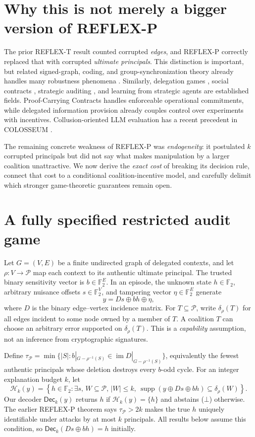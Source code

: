 \documentclass[10pt,a4paper]{article}
\newcommand{\F}{\mathbb F_2}
\newcommand{\Pc}{\mathcal P}
\newcommand{\supp}{\operatorname{supp}}
\newcommand{\Dec}{\mathsf{Dec}}
\newcommand{\deltaP}{\delta_\rho}
\begin{document}
\section{Why this is not merely a bigger version of REFLEX-P}
The prior REFLEX-T result counted corrupted \emph{edges}, and REFLEX-P correctly replaced that with corrupted \emph{ultimate principals}. This distinction is important, but related signed-graph, coding, and group-synchronization theory already handles many robustness phenomena \cite{lerman2021,group2026}. Similarly, delegation games \cite{sourbut2024}, social contracts \cite{davoust2020}, strategic auditing \cite{das2026}, and learning from strategic agents \cite{cacciamani2024} are established fields. Proof-Carrying Contracts \cite{ciliberto2026} handles enforceable operational commitments, while delegated information provision \cite{bilotta2026} already couples control over experiments with incentives. Collusion-oriented LLM evaluation has a recent precedent in COLOSSEUM \cite{colosseum2026}.\par
The remaining concrete weakness of REFLEX-P was \emph{endogeneity}: it postulated $k$ corrupted principals but did not say what makes manipulation by a larger coalition unattractive. We now derive the \emph{exact cost} of breaking its decision rule, connect that cost to a conditional coalition-incentive model, and carefully delimit which stronger game-theoretic guarantees remain open.

\section{A fully specified restricted audit game}
Let $G=(V,E)$ be a finite undirected graph of delegated contexts, and let $\rho:V\to\Pc$ map each context to its authentic ultimate principal. The trusted binary sensitivity vector is $b\in\F^E$. In an episode, the unknown state $h\in\F$, arbitrary nuisance offsets $s\in\F^V$, and tampering vector $\eta\in\F^E$ generate
\begin{equation}\label{eq:binary}
 y=Ds\oplus bh\oplus\eta,
\end{equation}
where $D$ is the binary edge--vertex incidence matrix. For $T\subseteq\Pc$, write $\deltaP(T)$ for all edges incident to some node owned by a member of $T$. A coalition $T$ can choose an arbitrary error supported on $\deltaP(T)$. This is a \emph{capability} assumption, not an inference from cryptographic signatures.\par
Define $\tau_\Pc=\min\{|S|: b|_{G-\rho^{-1}(S)}\in\operatorname{im}D|_{G-\rho^{-1}(S)}\}$, equivalently the fewest authentic principals whose deletion destroys every $b$-odd cycle. For an integer explanation budget $k$, let
\begin{equation}\label{eq:plausible}
 \mathcal H_k(y)=\left\{h\in\F:\exists s,\, W\subseteq\Pc,\,|W|\le k,\ \supp(y\oplus Ds\oplus bh)\subseteq\deltaP(W)\right\}.
\end{equation}
Our decoder $\Dec_k(y)$ returns $h$ if $\mathcal H_k(y)=\{h\}$ and abstains ($\bot$) otherwise. The earlier REFLEX-P theorem says $\tau_\Pc>2k$ makes the true $h$ uniquely identifiable under attacks by at most $k$ principals. All results below assume this condition, so $\Dec_k(Ds\oplus bh)=h$ initially.
\end{document}
